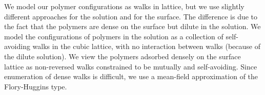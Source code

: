 \documentclass[journal=mamobx,manuscript=article]{achemso}
\begin{document}

%



We model our polymer configurations as walks in lattice, but we use slightly different approaches for the solution and for the surface.
The difference is due to the fact that the polymers are dense on the surface but 
dilute in the solution.  We model the configurations of polymers in the solution as a collection of 
self-avoiding walks in the cubic lattice, with no interaction between walks (because of the dilute solution).
We view the polymers adsorbed densely on the surface lattice as non-reversed walks constrained to
be mutually and self-avoiding.  Since enumeration of
dense walks is difficult, we use a mean-field 
approximation of the Flory-Huggins type.\cite{Flory1953}
\end{document}
